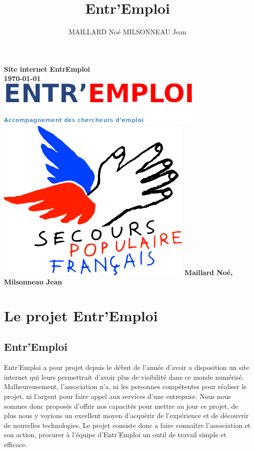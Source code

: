 \documentclass[a4paper, 12pt]{report}
\title{Entr'Emploi}
\author{MAILLARD Noé MILSONNEAU Jean}
\begin{document}
\begin{titlepage}
	\thispagestyle{empty}
    \centering
    {\bfseries\Large
    		Site internet EntrEmploi\\
        \today\\
        \vskip3cm
        \includegraphics{../../public/images/Logo-entremploi-md.png}
        \vskip15mm
        \includegraphics{../../public/images/Logo-spf.png}
        \vskip3cm
        Maillard Noé, Milsonneau Jean\\
    }
    \normalsize
\end{titlepage}

\tableofcontents
\chapter{Le projet Entr'Emploi}
\thispagestyle{fancy}
\section{Entr'Emploi}
Entr'Emploi a pour projet depuis le début de l'année d'avoir a disposition un site internet qui leurs permettrait d'avoir plus de visibilité
dans ce monde numérisé. Malheureusement, l'association n'a, ni les personnes compétentes pour réaliser le projet, ni l'argent pour faire appel aux services d'une entreprise.
Nous nous sommes donc proposés d’offrir nos capacités pour mettre au jour ce projet, de plus nous y voyions un excellent moyen d’acquérir de l'expérience et de découvrir de nouvelles technologies.
Le projet consiste donc a faire connaître l'association et son action, procurer à l'équipe d'Entr'Emploi un outil de travail simple et efficace.
\end{document}
